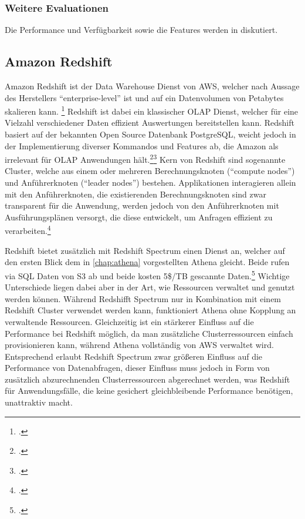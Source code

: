 \subsubsection{Weitere Evaluationen}
Die Performance und Verfügbarkeit sowie die Features werden in  diskutiert.


\subsection{Amazon Redshift}

Amazon Redshift ist der Data Warehouse Dienst von \ac{AWS}, welcher nach Aussage des Herstellers \enquote{enterprise-level} ist und auf ein Datenvolumen von Petabytes skalieren kann. \footcite[Vgl.][1]{AmazonWebServicesInc..o.J.g} Redshift ist dabei ein klassischer \ac{OLAP} Dienst, welcher für eine Vielzahl verschiedener Daten effizient Auswertungen bereitstellen kann. Redshift basiert auf der bekannten Open Source Datenbank PostgreSQL, weicht jedoch in der Implementierung diverser Kommandos und Features ab, die Amazon als irrelevant für \ac{OLAP} Anwendungen hält.\footcite[Vgl.][4]{AmazonWebServicesInc..o.J.g}\nzitat\footcite[Vgl.][428\psqq]{AmazonWebServicesInc..o.J.g} Kern von Redshift sind sogenannte Cluster, welche aus einem oder mehreren Berechnungsknoten (\enquote{compute nodes}) und Anführerknoten (\enquote{leader nodes}) bestehen. Applikationen interagieren allein mit den Anführerknoten, die existierenden Berechnungsknoten sind zwar transparent für die Anwendung, werden jedoch von den Anführerknoten mit Ausführungsplänen versorgt, die diese entwickelt, um Anfragen effizient zu verarbeiten.\footcite[Vgl.][4]{AmazonWebServicesInc..o.J.g}

Redshift bietet zusätzlich mit Redshift Spectrum einen Dienst an, welcher auf den ersten Blick dem in \autoref{chap:athena} vorgestellten Athena gleicht. Beide rufen via \ac{SQL} Daten von \ac{S3} ab und beide kosten 5\$/TB gescannte Daten.\footcite[Vgl. auch im Folgenden][]{Smallcombe.2020} Wichtige Unterschiede liegen dabei aber in der Art, wie Ressourcen verwaltet und genutzt werden können. Während Redshifft Spectrum nur in Kombination mit einem Redshift Cluster verwendet werden kann, funktioniert Athena ohne Kopplung an verwaltende Ressourcen. Gleichzeitig ist ein stärkerer Einfluss auf die Performance bei Redshift möglich, da man zusätzliche Clusterressourcen einfach provisionieren kann, während Athena vollständig von \ac{AWS} verwaltet wird. Entsprechend erlaubt Redshift Spectrum zwar größeren Einfluss auf die Performance von Datenabfragen, dieser Einfluss muss jedoch in Form von zusätzlich abzurechnenden Clusterressourcen abgerechnet werden, was Redshift für Anwendungsfälle, die keine gesichert gleichbleibende Performance benötigen, unattraktiv macht.

